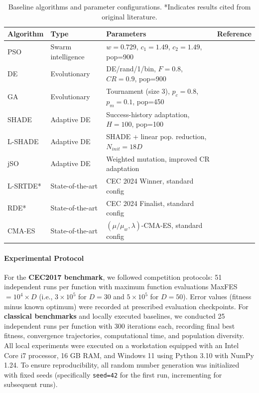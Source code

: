 \documentclass[11pt]{article}
\begin{document}
\begin{table}[ht]
\centering
\caption{Baseline algorithms and parameter configurations. *Indicates results cited from original literature.}
\label{tab:baselines}
\small
\begin{tabular}{@{}llp{5.5cm}l@{}}
\toprule
Algorithm & Type & Parameters & Reference \\
\midrule
PSO & Swarm intelligence & $w=0.729$, $c_1=1.49$, $c_2=1.49$, pop=900 & \cite{kennedy1995particle} \\
DE & Evolutionary & DE/rand/1/bin, $F=0.8$, $CR=0.9$, pop=900 & \cite{storn1997differential} \\
GA & Evolutionary & Tournament (size 3), $p_c=0.8$, $p_m=0.1$, pop=450 & \cite{goldberg1989genetic} \\
SHADE & Adaptive DE & Success-history adaptation, $H=100$, pop=100 & \cite{tanabe2013shade} \\
L-SHADE & Adaptive DE & SHADE + linear pop. reduction, $N_{init}=18D$ & \cite{tanabe2014lshade} \\
jSO & Adaptive DE & Weighted mutation, improved CR adaptation & \cite{brest2017jso} \\
L-SRTDE* & State-of-the-art & CEC 2024 Winner, standard config & \cite{stanovov2024lsrtde} \\
RDE* & State-of-the-art & CEC 2024 Finalist, standard config & \cite{tao2024rde} \\
CMA-ES & State-of-the-art & $(\mu/\mu_w, \lambda)$-CMA-ES, standard config & \cite{hansen2001completely} \\
\bottomrule
\end{tabular}
\end{table}

\paragraph{Experimental Protocol} For the \textbf{CEC2017 benchmark}, we followed competition protocols: 51 independent runs per function with maximum function evaluations MaxFES $= 10^4 \times D$ (i.e., $3 \times 10^5$ for $D=30$ and $5 \times 10^5$ for $D=50$). Error values (fitness minus known optimum) were recorded at prescribed evaluation checkpoints. For \textbf{classical benchmarks} and locally executed baselines, we conducted 25 independent runs per function with 300 iterations each, recording final best fitness, convergence trajectories, computational time, and population diversity. All local experiments were executed on a workstation equipped with an Intel Core i7 processor, 16 GB RAM, and Windows 11 using Python 3.10 with NumPy 1.24. To ensure reproducibility, all random number generation was initialized with fixed seeds (specifically \texttt{seed=42} for the first run, incrementing for subsequent runs).
\end{document}
